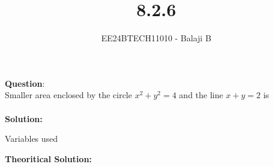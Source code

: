 \documentclass[journal]{IEEEtran}
\begin{document}

\vspace{3cm}

\title{8.2.6}
\author{EE24BTECH11010 - Balaji B}
 \maketitle
{\let\newpage\relax\maketitle}

\renewcommand{\thefigure}{\theenumi}
\renewcommand{\thetable}{\theenumi}
\setlength{\intextsep}{10pt} %


\renewcommand{\thetable}{\theenumi}

\textbf{Question}:\\
Smaller area enclosed by the circle $x^2 + y^2 = 4 $ and the line $x + y = 2 $ is 
\\ \\
\textbf{Solution:}\\
\begin{table}[H]
    \centering
    
    \caption{Variables used}
    \label{tab1-1.2-20}
\end{table} 
\textbf{Theoritical Solution: }
\end{document}

